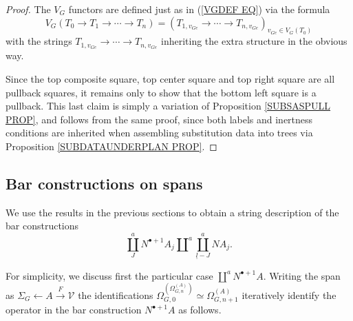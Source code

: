 \documentclass[a4paper,10pt]{article}%
\begin{document}
\begin{proof}
	The $V_G$ functors are defined just as in (\ref{VGDEF EQ}) via the formula
	\[
	V_G(T_0 \to T_1 \to \cdots \to T_n) = 
	(T_{1,v_{Ge}} \to \cdots \to
	T_{n,v_{Ge}})_{v_{Ge} \in V_G(T_0)}\]
with the strings 
$T_{1,v_{Ge}} \to \cdots \to T_{n,v_{Ge}}$
inheriting the extra structure in the obvious way.

Since the top composite square, top center square and top right square are all pullback squares, it remains only to show that the bottom left square is a pullback.
This last claim is simply a variation of Proposition \ref{SUBSASPULL PROP}, and follows from the same proof, since both labels and inertness conditions are inherited when assembling substitution data into trees via Proposition \ref{SUBDATAUNDERPLAN PROP}.
\end{proof}


\subsection{Bar constructions on spans}

We use the results in the previous sections to obtain a string description of the bar constructions
\[
\coprod_J^a N^{\bullet +1} A_j \amalg^a
\coprod_{\underline{l}-J}^a N A_j.
\]

For simplicity, we discuss first the particular case 
$\coprod^a N^{\bullet +1} A$. Writing the span as 
$\Sigma_G \leftarrow A \xrightarrow{F} \mathcal{V}$
the identifications 
$\Omega_{G,0}^{\left( \Omega_{G,n}^{(A)} \right)} \simeq \Omega_{G,n+1}^{(A)}$
iteratively identify the operator in the bar construction
$N^{\bullet+1} A$ as follows.
\end{document}
